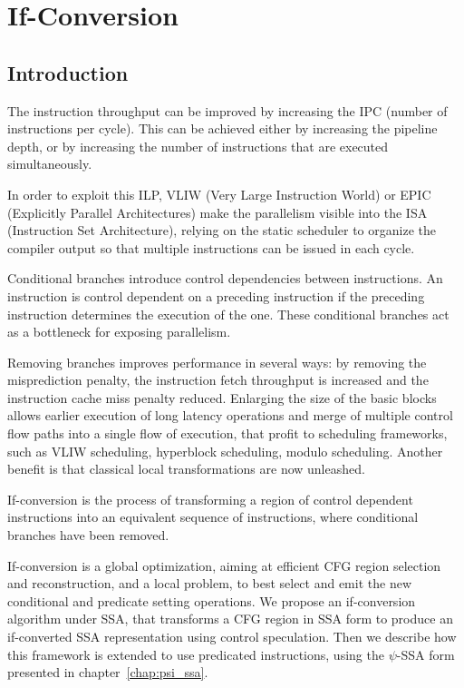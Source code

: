\chapter{If-Conversion }\label{chap:if_conversion}
\label{chap:if_conv}
\graphicspath{{img/}{if_conversion/img/}{part4/if_conversion/img/}}

\newcommand\cond{~?~}
\newcommand{\annotation}[1]{%
  \marginpar{\small\itshape\color{red}#1}}


\section{Introduction}

The instruction throughput can be improved by increasing the IPC (number of instructions per cycle). This can be achieved either by increasing the pipeline depth, or by increasing the number of instructions that are executed simultaneously.

In order to exploit this ILP, VLIW (Very Large Instruction World) or EPIC (Explicitly Parallel Architectures) make the parallelism visible into the ISA (Instruction Set Architecture), relying on the static scheduler to organize the compiler output so that multiple instructions can be issued in each cycle.

Conditional branches introduce control dependencies between instructions. An instruction is control dependent on a preceding instruction if the preceding instruction determines the execution of the one. These conditional branches act as a bottleneck for exposing parallelism.

Removing branches improves performance in several ways: by removing the misprediction penalty, the instruction fetch throughput is increased and the instruction cache miss penalty reduced. Enlarging the size of the basic blocks allows earlier execution of long latency operations and merge of multiple control flow paths into a single flow of execution, that profit to scheduling frameworks, such as VLIW scheduling, hyperblock scheduling, modulo scheduling. Another benefit is that classical local transformations are now unleashed.

If-conversion is the process of transforming a region of control dependent instructions into an equivalent sequence of instructions, where conditional branches have been removed. 

If-conversion is a global optimization, aiming at efficient CFG region selection and reconstruction, and a local problem, to best select and emit the new conditional and predicate setting operations.
We propose an if-conversion algorithm under SSA, that transforms a CFG region in SSA form to produce an if-converted SSA representation using control speculation.
Then we describe how this framework is extended to use predicated instructions, using the $\psi$-SSA form presented in chapter~\ref{chap:psi_ssa}.

